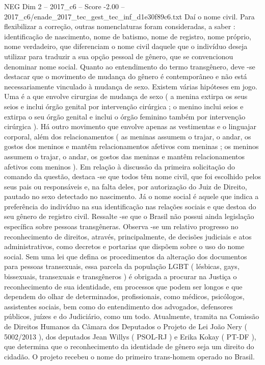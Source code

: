 \begin{textsample}{NEG Dim 2 – 2017\_c6 – Score -2.00 – 2017\_c6/enade\_2017\_tec\_gest\_tec\_inf\_d1e30f89c6.txt}
Daí o nome civil.
Para flexibilizar a correção, outras nomenclaturas foram consideradas, a saber : identificação de nascimento, nome de batismo, nome de registro, nome próprio, nome verdadeiro, que diferenciam o nome civil daquele que o indivíduo deseja utilizar para traduzir a sua opção pessoal de gênero, que se convencionou denominar nome social.
Quanto ao entendimento do termo transgênero, deve -se destacar que o movimento de mudança do gênero é contemporâneo e não está necessariamente vinculado à mudança de sexo.
Existem várias hipóteses em jogo.
Uma é a que envolve cirurgias de mudança de sexo ( a menina extirpa os seus seios e inclui órgão genital por intervenção cirúrgica ; o menino inclui seios e extirpa o seu órgão genital e inclui o órgão feminino também por intervenção cirúrgica ).
Há outro movimento que envolve apenas as vestimentas e o linguajar corporal, além dos relacionamentos ( as meninas assumem o trajar, o andar, os gostos dos meninos e mantêm relacionamentos afetivos com meninas ; os meninos assumem o trajar, o andar, os gostos das meninas e mantêm relacionamentos afetivos com meninos ).
Em relação à discussão da primeira solicitação do comando da questão, destaca -se que todos têm nome civil, que foi escolhido pelos seus pais ou responsáveis e, na falta deles, por autorização do Juiz de Direito, pautado no sexo detectado no nascimento.
Já o nome social é aquele que indica a preferência do indivíduo na sua identificação nas relações sociais e que destoa do seu gênero de registro civil.
Ressalte -se que o Brasil não possui ainda legislação específica sobre pessoas transgêneras.
Observa -se um relativo progresso no reconhecimento de direitos, através, principalmente, de decisões judiciais e atos administrativos, como decretos e portarias que dispõem sobre o uso do nome social.
Sem uma lei que defina os procedimentos da alteração dos documentos para pessoas transexuais, essa parcela da população LGBT ( lésbicas, gays, bissexuais, transexuais e transgêneros ) é obrigada a procurar na Justiça o reconhecimento de sua identidade, em processos que podem ser longos e que dependem do olhar de determinados, profissionais, como médicos, psicólogos, assistentes sociais, bem como do entendimento dos advogados, defensores públicos, juízes e do Judiciário, como um todo.
Atualmente, tramita na Comissão de Direitos Humanos da Câmara dos Deputados o Projeto de Lei João Nery ( 5002/2013 ), dos deputados Jean Willys ( PSOL-RJ ) e Erika Kokay ( PT-DF ), que determina que o reconhecimento da identidade de gênero seja um direito do cidadão.
O projeto recebeu o nome do primeiro trans-homem operado no Brasil.

\end{textsample}
